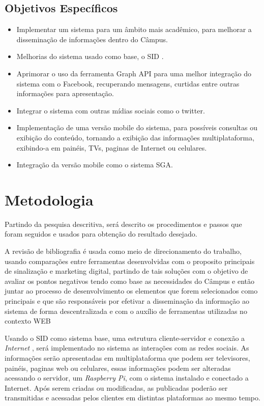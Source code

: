 \subsection{Objetivos Específicos}
	 \begin{itemize}
	\item Implementar um sistema para um âmbito mais acadêmico, para melhorar a disseminação de informações dentro do Câmpus.
	 	
	\item Melhorias do sistema usado como base, o SID \cite{sobrinho2017}.
	
	\item Aprimorar o uso da ferramenta Graph API para uma melhor integração do sistema com o Facebook, recuperando mensagens, curtidas entre outras informações para apresentação.
	
	\item Integrar o sistema com outras mídias sociais como o twitter.
	
	\item Implementação de uma versão mobile do sistema, para possíveis consultas ou exibição do conteúdo, tornando a exibição das informações multiplataforma, exibindo-a em painéis, TVs, paginas de Internet ou celulares.
	
	\item  Integração da versão mobile como o sistema SGA.
	\end{itemize}
\section{Metodologia}
Partindo da pesquisa descritiva, será descrito os procedimentos e passos que foram seguidos e usados para obtenção do resultado desejado.
	
A revisão de bibliografia é usada como meio de direcionamento do trabalho, usando comparações entre ferramentas desenvolvidas com o proposito principais de sinalização e marketing digital, partindo de tais soluções com o objetivo de avaliar os pontos negativos tendo como base as necessidades do Câmpus e então juntar ao processo de desenvolvimento os elementos que forem selecionados como principais e que são responsáveis por efetivar a disseminação da informação ao sistema de forma descentralizada e com o auxílio de ferramentas utilizadas no contexto WEB
	 
Usando o SID como sistema base, uma estrutura cliente-servidor e conexão a \textit{Internet} , será implementado no sistema as interações com as redes sociais. As informações serão apresentadas em multiplataforma que podem ser televisores, painéis, paginas web ou celulares, essas informações podem ser alteradas acessando o servidor, um \textit{Raspberry Pi}, com o sistema instalado e conectado a Internet. Após serem criadas ou modificadas, as publicadas poderão ser transmitidas e acessadas pelos clientes em distintas plataformas ao mesmo tempo.
	
